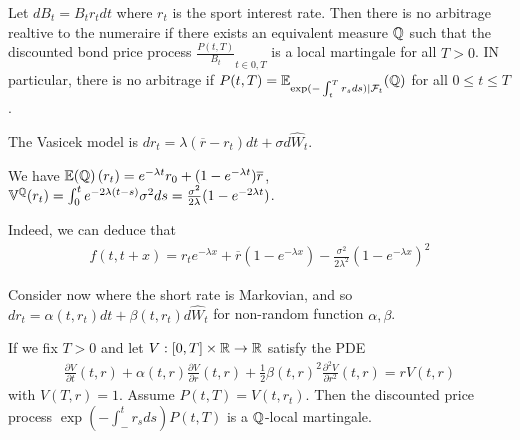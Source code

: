 \begin{thm}
  \label{sec:interest-rate-models-3}
  Let $dB_{t} = B_{t} r_{t} dt$ where $r_{t}$ is the sport interest
  rate.  Then there is no arbitrage realtive to the numeraire if there
  exists an equivalent measure $\Q$ such that the discounted bond
  price process $\frac{P(t, T)}{B_{t}}_{t \in 0, T}$ is a local
  martingale for all $T > 0$.  IN particular, there is no arbitrage if
  $P(t, T) = \E{\Q}{\exp(-\int_{t}^{T} r_{s} ds) | \mathcal{F}_{t}}$
  for all $0 \leq t \leq T$.
\end{thm}

\begin{defn}
  \label{sec:interest-rate-models-4}
  The Vasicek model is $dr_{t} = \lambda(\overline r - r_{t}) dt +
  \sigma d\hat W_{t}$.

  We have $\E{\Q}(r_{t}) = e^{-\lambda t} r_{0} + (1 - e^{-\lambda t})
  \overline r$, $\Var^{\Q}(r_{t}) = \int_{0}^{t} e^{-2\lambda(t-s)}
  \sigma^{2} ds = \frac{\sigma^{2}}{2\lambda} (1 - e^{-2\lambda t})$.

  Indeed, we can deduce that
  \begin{align}
    \label{eq:28}
    f(t, t + x) = r_{t} e^{-\lambda x} + \overline r(1 - e^{-\lambda
      x}) - \frac{\sigma^{2}}{2 \lambda^{2}} (1 - e^{-\lambda x})^{2}
  \end{align}
\end{defn}

\begin{thm}
  \label{sec:interest-rate-models-5}
  Consider now where the short rate is Markovian, and so $dr_{t} =
  \alpha(t, r_{t}) dt + \beta(t, r_{t}) d \hat W_{t}$ for non-random
  function $\alpha, \beta$.

  If we fix $T > 0$ and let $V: [0, T] \times \mathbb{R} \rightarrow \mathbb{R}$
  satisfy the PDE
  \begin{align}
    \label{eq:29}
    \frac{\partial V}{\partial t}(t, r) + \alpha(t, r) \frac{\partial
      V}{\partial r}(t, r) + \frac{1}{2} \beta(t, r)^{2}
    \frac{\partial^{2} V}{\partial r^{2}}(t, r) = rV(t, r)
  \end{align} with $V(T, r) = 1$.  Assume $P(t, T) = V(t, r_{t})$.
  Then the discounted price process $\exp(-\int_{-}^{t} r_{s} ds) P(t,
  T)$ is a $\Q$-local martingale.
\end{thm}





